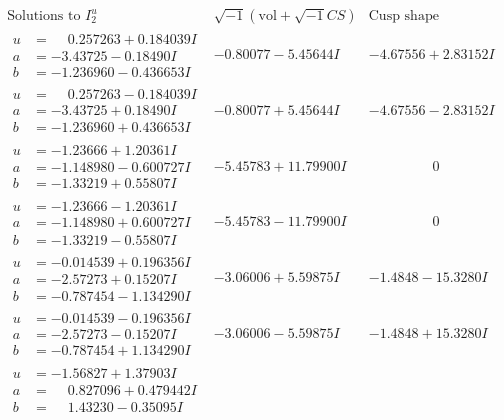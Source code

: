 \documentclass[1p]{elsarticle_modified}
\theoremstyle{definition}
\newcommand{\I}{\sqrt{-1}}
\begin{document}
$$\begin{array}{c|c|c}
\text{Solutions to }I^u_{2}& \I (\text{vol} + \sqrt{-1}CS) & \text{Cusp shape}\\
 \hline 
\begin{aligned}
u &= \phantom{-}0.257263 + 0.184039 I \\
a &= -3.43725 - 0.18490 I \\
b &= -1.236960 - 0.436653 I\end{aligned}
 & -0.80077 - 5.45644 I & -4.67556 + 2.83152 I \\ \hline\begin{aligned}
u &= \phantom{-}0.257263 - 0.184039 I \\
a &= -3.43725 + 0.18490 I \\
b &= -1.236960 + 0.436653 I\end{aligned}
 & -0.80077 + 5.45644 I & -4.67556 - 2.83152 I \\ \hline\begin{aligned}
u &= -1.23666 + 1.20361 I \\
a &= -1.148980 - 0.600727 I \\
b &= -1.33219 + 0.55807 I\end{aligned}
 & -5.45783 + 11.79900 I & \phantom{-0.000000 } 0 \\ \hline\begin{aligned}
u &= -1.23666 - 1.20361 I \\
a &= -1.148980 + 0.600727 I \\
b &= -1.33219 - 0.55807 I\end{aligned}
 & -5.45783 - 11.79900 I & \phantom{-0.000000 } 0 \\ \hline\begin{aligned}
u &= -0.014539 + 0.196356 I \\
a &= -2.57273 + 0.15207 I \\
b &= -0.787454 - 1.134290 I\end{aligned}
 & -3.06006 + 5.59875 I & -1.4848 - 15.3280 I \\ \hline\begin{aligned}
u &= -0.014539 - 0.196356 I \\
a &= -2.57273 - 0.15207 I \\
b &= -0.787454 + 1.134290 I\end{aligned}
 & -3.06006 - 5.59875 I & -1.4848 + 15.3280 I \\ \hline\begin{aligned}
u &= -1.56827 + 1.37903 I \\
a &= \phantom{-}0.827096 + 0.479442 I \\
b &= \phantom{-}1.43230 - 0.35095 I\end{aligned}

\end{array}$$
\end{document}
